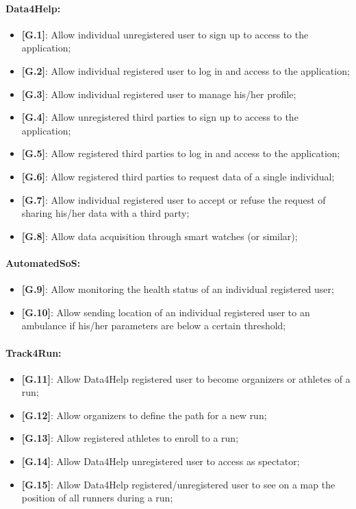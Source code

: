 \paragraph{Data4Help:}
\begin{itemize}
  \item \textbf{[G.1]}: Allow individual unregistered user to sign up to access to the application;
  \item \textbf{[G.2]}: Allow individual registered user to log in and access to the application;
  \item \textbf{[G.3]}: Allow individual registered user to manage his/her profile;
  \item \textbf{[G.4]}: Allow unregistered third parties to sign up to access to the application;
  \item \textbf{[G.5]}: Allow registered third parties to log in and access to the application;
  \item \textbf{[G.6]}: Allow registered third parties to request data of a single individual;
  \item \textbf{[G.7]}: Allow individual registered user to accept or refuse the request of sharing his/her data with a third party;
  \item \textbf{[G.8]}: Allow data acquisition through smart watches (or similar);
\end{itemize}

\paragraph{AutomatedSoS:}
\begin{itemize}
  \item \textbf{[G.9]}: Allow monitoring the health status of an individual registered user;
  \item \textbf{[G.10]}: Allow sending location of an individual registered user to an ambulance if his/her parameters are below a certain threshold;
\end{itemize}

\paragraph{Track4Run:}
\begin{itemize}
  \item \textbf{[G.11]}: Allow Data4Help registered user to become organizers or athletes of a run;
  \item \textbf{[G.12]}: Allow organizers to define the path for a new run;
  \item \textbf{[G.13]}: Allow registered athletes to enroll to a run;
  \item \textbf{[G.14]}: Allow Data4Help unregistered user to access as spectator;
  \item \textbf{[G.15]}: Allow Data4Help registered/unregistered user to see on a map the position of all runners during a run;
\end{itemize}

